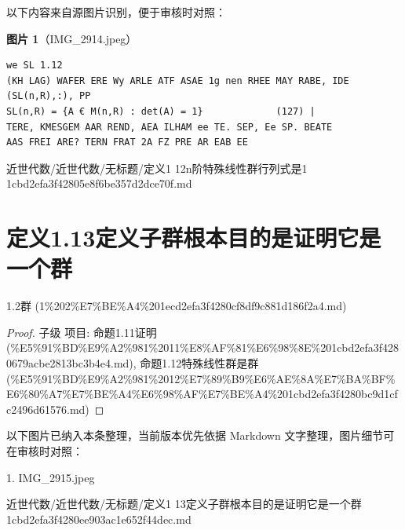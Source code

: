 \begin{note}
以下内容来自源图片识别，便于审核时对照：

\textbf{图片 1}（IMG\_2914.jpeg）
\begin{Verbatim}[fontsize=\small]
we SL 1.12
(KH LAG) WAFER ERE Wy ARLE ATF ASAE 1g nen RHEE MAY RABE, IDE (SL(n,R),:), PP
SL(n,R) = {A € M(n,R) : det(A) = 1}             (127) |
TERE, KMESGEM AAR REND, AEA ILHAM ee TE. SEP, Ee SP. BEATE
AAS FREI ARE? TERN FRAT 2A FZ PRE AR EAB EE
\end{Verbatim}

\end{note}

\begin{note}[来源路径]

近世代数/近世代数/无标题/定义1 12n阶特殊线性群行列式是1 1cbd2efa3f42805e8f6be357d2dce70f.md

\end{note}

\section*{定义1.13定义子群根本目的是证明它是一个群}

\begin{note}[来源上级主题]

1.2群 (1\%202\%E7\%BE\%A4\%201ecd2efa3f4280cf8df9c881d186f2a4.md)

\end{note}

\begin{proof}

子级 项目: 命题1.11证明 (\%E5\%91\%BD\%E9\%A2\%981\%2011\%E8\%AF\%81\%E6\%98\%8E\%201cbd2efa3f4280679acbe2813bc3b4e4.md), 命题1.12特殊线性群是群 (\%E5\%91\%BD\%E9\%A2\%981\%2012\%E7\%89\%B9\%E6\%AE\%8A\%E7\%BA\%BF\%E6\%80\%A7\%E7\%BE\%A4\%E6\%98\%AF\%E7\%BE\%A4\%201cbd2efa3f4280bc9d1cfc2496d61576.md)

\end{proof}

\begin{note}[关联图片]
以下图片已纳入本条整理，当前版本优先依据 Markdown 文字整理，图片细节可在审核时对照：

1. IMG\_2915.jpeg\\

\end{note}

\begin{note}[来源路径]

近世代数/近世代数/无标题/定义1 13定义子群根本目的是证明它是一个群 1cbd2efa3f4280ee903ac1e652f44dec.md

\end{note}

